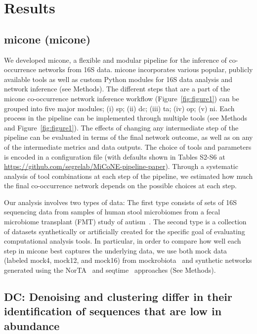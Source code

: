 
\section*{Results}

  \subsection*{\acl{micone} (\acs{micone})}

  We developed \ac{micone}, a flexible and modular pipeline for the inference of co-occurrence networks from 16S data.
  \ac{micone} incorporates various popular, publicly available tools as well as custom Python modules for 16S data analysis and network inference (see Methods).
  The different steps that are a part of the \ac{micone} co-occurrence network inference workflow (Figure~\ref{fig:figure1}) can be grouped into five major modules; (i) \ac{sp}; (ii) \ac{dc}; (iii) \ac{ta}; (iv) \ac{op}; (v) \ac{ni}.
  Each process in the pipeline can be implemented through  multiple tools (see Methods and Figure~\ref{fig:figure1}).
  The effects of changing any intermediate step of the pipeline can be evaluated in terms of the final network outcome, as well as on any of the intermediate metrics and data outputs.
  The choice of tools and parameters is encoded in a configuration file (with defaults shown in Tables S2-S6 at \href{https://github.com/segrelab/MiCoNE-pipeline-paper}{https://github.com/segrelab/MiCoNE-pipeline-paper}).
  Through a systematic analysis of tool combinations at each step of the pipeline, we estimated how much the final co-occurrence network depends on the possible choices at each step.

  Our analysis involves two types of data: The first type consists of sets of 16S sequencing data from samples of human stool microbiomes from a fecal microbiome transplant (FMT) study of autism~\cite{Kang2017}.
  The second type is a collection of datasets synthetically or artificially created for the specific goal of evaluating computational analysis tools.
  In particular, in order to  compare how well each step in \ac{micone} best captures the underlying data, we use both mock data (labeled mock4, mock12, and mock16) from mockrobiota~\cite{Bokulich2016} and synthetic networks generated using the NorTA~\cite{Kurtz2015} and seqtime~\cite{Rottjers2018} approaches (See Methods).

  \FloatBarrier

  \subsection*{DC: Denoising and clustering differ in their identification of sequences that are low in abundance}

